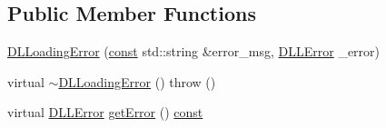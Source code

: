 \subsection*{Public Member Functions}
\begin{DoxyCompactItemize}
\item 
\hyperlink{classarcade_1_1_d_l_loading_error_acab26a26ba58d3c403143373a2e11fb7}{D\-L\-Loading\-Error} (\hyperlink{term__entry_8h_a57bd63ce7f9a353488880e3de6692d5a}{const} std\-::string \&error\-\_\-msg, \hyperlink{classarcade_1_1_d_l_loading_error_a84cd98868dfc8c4a27e8e524919778ab}{D\-L\-L\-Error} \-\_\-error)
\item 
virtual \hyperlink{classarcade_1_1_d_l_loading_error_a7a188d1ff55948d8e05f1c57b9b3ecba}{$\sim$\-D\-L\-Loading\-Error} ()  throw ()
\item 
virtual \hyperlink{classarcade_1_1_d_l_loading_error_a84cd98868dfc8c4a27e8e524919778ab}{D\-L\-L\-Error} \hyperlink{classarcade_1_1_d_l_loading_error_a5c1fc0dcb7a4da8fa8136fc7c92123d2}{get\-Error} () \hyperlink{term__entry_8h_a57bd63ce7f9a353488880e3de6692d5a}{const} 
\end{DoxyCompactItemize}


